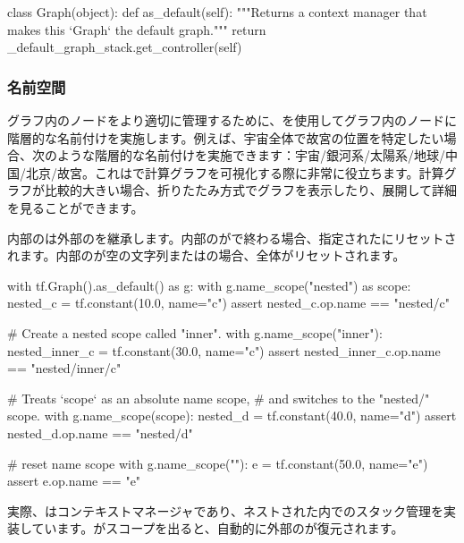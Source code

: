 \begin{content}
\begin{leftbar}
\begin{python}
class Graph(object):
  def as_default(self):
    """Returns a context manager that makes this `Graph` the default graph."""
    return _default_graph_stack.get_controller(self)
\end{python}
\end{leftbar}

\subsubsection{名前空間}

グラフ内のノードをより適切に管理するために、を使用してグラフ内のノードに階層的な名前付けを実施します。例えば、宇宙全体で故宮の位置を特定したい場合、次のような階層的な名前付けを実施できます：宇宙/銀河系/太陽系/地球/中国/北京/故宮。これはで計算グラフを可視化する際に非常に役立ちます。計算グラフが比較的大きい場合、折りたたみ方式でグラフを表示したり、展開して詳細を見ることができます。

内部のは外部のを継承します。内部のが\code{/}で終わる場合、指定されたにリセットされます。内部のが空の文字列またはの場合、全体がリセットされます。

\begin{leftbar}
\begin{python}
with tf.Graph().as_default() as g:
  with g.name_scope("nested") as scope:
    nested_c = tf.constant(10.0, name="c")
    assert nested_c.op.name == "nested/c"

    # Create a nested scope called "inner".
    with g.name_scope("inner"):
      nested_inner_c = tf.constant(30.0, name="c")
      assert nested_inner_c.op.name == "nested/inner/c"

      # Treats `scope` as an absolute name scope, 
      # and switches to the "nested/" scope.
      with g.name_scope(scope):
        nested_d = tf.constant(40.0, name="d")
        assert nested_d.op.name == "nested/d"

        # reset name scope
        with g.name_scope(""):
          e = tf.constant(50.0, name="e")
          assert e.op.name == "e"
\end{python}
\end{leftbar}

実際、はコンテキストマネージャであり、ネストされた内でのスタック管理を実装しています。がスコープを出ると、自動的に外部のが復元されます。


\end{content}
